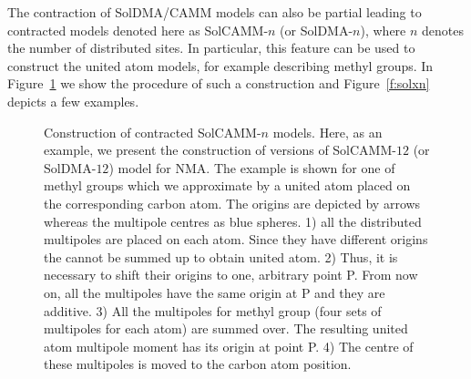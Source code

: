 \documentclass[a4paper,titlepage,twoside,fleqn,12pt]{book}
\begin{document}
\begin{refsection}
The contraction of SolDMA/CAMM models can also be partial
leading to contracted models denoted here as SolCAMM-$n$ (or SolDMA-$n$), where
$n$ denotes the number of distributed sites. In particular,
this feature can be used to construct the united atom models,
for example describing methyl groups. In Figure~\ref{f:contr}
we show the procedure of such a construction and Figure~\ref{f:solxn}
depicts a few examples.
%
\begin{figure}[!ht]
\centering
\setlength\fboxsep{0.4pt}
\setlength\fboxrule{0.5pt}
\caption{Construction of contracted SolCAMM-$n$ models. Here, as an example, we present
the construction of versions of SolCAMM-$12$ (or SolDMA-$12$) model for NMA. 
The example is shown for one of methyl groups which we approximate by a united atom 
placed on the corresponding carbon atom. The origins are depicted by arrows
whereas the multipole centres as blue spheres. 1) all the distributed multipoles 
are placed on each atom. Since they have different origins the cannot be summed up 
to obtain united atom. 2) Thus, it is necessary to shift their origins to one, 
arbitrary point P. From now on, all the multipoles have the same origin at P 
and they are additive. 3) All the multipoles for methyl group (four sets 
of multipoles for each atom) are summed over. The resulting united atom 
multipole moment has its origin at point P. 4) The centre of these multipoles 
is moved to the carbon atom position.
\label{f:contr}}
\end{figure}
%


\end{refsection}
\end{document}
